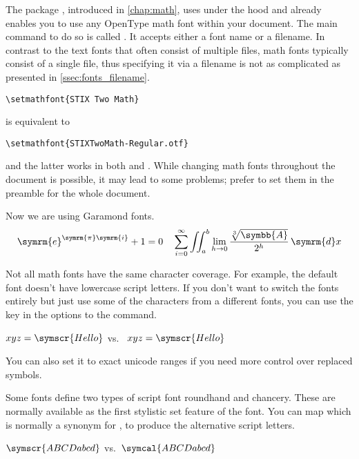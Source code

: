 The package , introduced in \autoref{chap:math}, uses
 under the hood and already enables you to use any OpenType math
font within your document. The main command to do so is called
. It accepts either a font name or a filename. In contrast to
the text fonts that often consist of multiple files, math fonts typically
consist of a single file, thus specifying it via a filename is not as
complicated as presented in \autoref{ssec:fonts_filename}.
\begin{code}
  \begin{verbatim}
\setmathfont{STIX Two Math}
  \end{verbatim}
\end{code}
is equivalent to
\begin{code}
  \begin{verbatim}
\setmathfont{STIXTwoMath-Regular.otf}
  \end{verbatim}
\end{code}
and the latter works in both  and . While
changing math fonts throughout the document is possible, it may lead to some
problems; prefer to set them in the preamble for the whole document.
\begin{example}
\setoperatorfont\symrm%
\setmainfont{Garamond Libre}
Now we are using Garamond fonts.
\[
  \symrm{e}^{\symrm{\pi}
    \symrm{i}} + 1 = 0 \quad
  \sum_{i=0}^\infty \iint_a^b
  \lim_{h\to0}\frac{\sqrt[3]{
    \symbb{A}}}{2^h}\,\symrm{d}x
\]
\end{example}

Not all math fonts have the same character coverage. For example, the default
font doesn't have lowercase script letters. If you don't want to switch the
fonts entirely but just use some of the characters from a different fonts, you
can use the  key in the options to the  command.
\begin{example}
\(xyz = \symscr{Hello}\) vs.\
\(xyz = \symscr{Hello}\)
\end{example}
You can also set it to exact unicode ranges if you need more control over
replaced symbols.

Some fonts define two types of script font roundhand and chancery. These are
normally available as the first stylistic set feature of the font. You can map
\csi{symcal} which is normally a synonym for \csi{symscr}, to produce the
alternative script letters.
\begin{example}

\(\symscr{ABCDabcd}\) vs.\
\(\symcal{ABCDabcd}\) 
\end{example}

